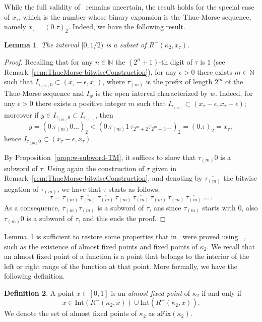 \documentclass[12pt]{article}
\theoremstyle{plain}\newtheorem{teo}{Theorem}
\theoremstyle{plain}\newtheorem{proposition}[teo]{Proposition}
\theoremstyle{plain}\newtheorem{lemma}[teo]{Lemma}
\theoremstyle{plain}\newtheorem{corollary}[teo]{Corollary}
\theoremstyle{plain}\newtheorem{conjecture}[teo]{Conjecture}
\theoremstyle{definition}\newtheorem{definition}[teo]{Definition}
\theoremstyle{remark}\newtheorem{remark}[teo]{Remark}
\theoremstyle{definition}\newtheorem{example}[teo]{Example}
\numberwithin{teo}{section}
\numberwithin{equation}{section}
\begin{document}
 While the full validity of~\cite[Proposition 19]{Critical}
remains uncertain,
the result holds for the special case 
of $x_\tau$,
which is the number whose binary expansion is the 
Thue-Morse sequence, namely
$x_\tau = (0.\tau)_2$.
Indeed, we have the following result.
\begin{lemma}
	\label{lem:leftRange-ThueMorse}
	The interval $[0,1/2)$ is a subset of $R^-(\kappa_2,x_\tau)$.
\end{lemma}
\begin{proof}
	Recalling that for any $n \in \mathbb{N}$ the 
	$(2^n + 1)$-th digit of $\tau$ is $1$
	(see Remark~\ref{rem:ThueMorse-bitwiseConstruction}),
	for any $\epsilon > 0$
	there exists $m \in \mathbb{N}$
	such that 
	$I_{\tau_{(m)}0} \subset (x_\tau - \epsilon,x_\tau)$,
	where $\tau_{(m)}$ is the prefix of length $2^m$ of 
	the Thue-Morse sequence and $I_w$ is the open interval 
	characterized by $w$.
	Indeed, for any $\epsilon > 0$
	there exists a positive integer $m$
	such that $I_{\tau_{(m)}} \subset (x_\tau - \epsilon,x_\tau + \epsilon)$;
	moreover if 
	$y \in I_{\tau_{(m)}0} \subset I_{\tau_{(m)}}$,
	then 
	\[
		y = (0.\tau_{(m)}0\ldots)_2
		< (0.\tau_{(m)}1\, \tau_{2^m + 2} \tau_{2^m + 3}\dots)_2
		= (0.\tau)_2 = x_\tau,
	\]
	hence $I_{\tau_{(m)}0} \subset (x_\tau-\epsilon,x_\tau)$.

	By Proposition~\ref{prop:w-subword-TM}, it suffices to show 
	that $\tau_{(m)}0$ is a subword of $\tau$.
	Using again the construction of $\tau$
	given in Remark~\ref{rem:ThueMorse-bitwiseConstruction},
	and denoting by $\overline{\tau_{(m)}}$
	the bitwise negation of $\tau_{(m)}$,
	we have that $\tau$ starts as follows:
	\[
	 \tau = \tau_{(m)}\,
	 \overline{\tau_{(m)}}\,
	 \overline{\tau_{(m)}}\,
	 \tau_{(m)}\,
	 \overline{\tau_{(m)}}\,
	 \tau_{(m)}\,
	 \tau_{(m)}\,
	 \overline{\tau_{(m)}}\,
	 \dots
	 \, .
	\]
	As a consequence, $\tau_{(m)}\tau_{(m)}$
	is a subword of $\tau$, ans since $\tau_{(m)}$
	starts with $0$,
	also $\tau_{(m)}0$ is a subword of $\tau$,
	and this ends the proof.
\end{proof}

Lemma~\ref{lem:leftRange-ThueMorse} is sufficient to restore some properties
that in~\cite{Critical} were proved using ~\cite[Proposition 19]{Critical},
such as the existence of almost fixed points and fixed points of $\kappa_2$.
We recall that an almost fixed point of a function is a point that belongs
to the interior of the left or right range of the function at that point.
More formally, we have the following definition.
\begin{definition}
A point $x\in [0,1]$ is an \emph{almost fixed point}
of $\kappa_2$ if and only if
\[
	x\in \mathrm{Int}(R^-(\kappa_2,x))\cup\mathrm{Int}(R^+(\kappa_2,x)).
\]
We denote the set of almost fixed points of $\kappa_2$
as $\mathrm{aFix}(\kappa_2)$.
\end{definition}
\end{document}

